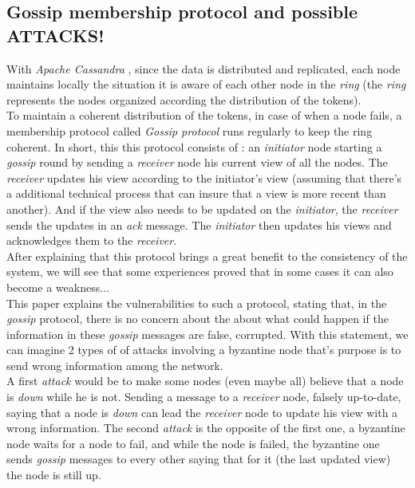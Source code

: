 \documentclass[a4paper]{report}
\newcommand{\ca}{\emph{Apache Cassandra }}
\begin{document}

\subsection{Gossip membership protocol and possible ATTACKS!} %
\label{sub:gossip_membership_protocol_and_potential_weaknesses}

With \ca, since the data is distributed and replicated, each node maintains locally the situation it is aware of each other node in the \emph{ring} (the \emph{ring} represents the nodes organized according the distribution of the tokens). \\
To maintain a coherent distribution of the tokens, in case of when a node fails, a membership protocol called \emph{Gossip protocol} runs regularly to keep the ring coherent. In short, this this protocol consists of : an \emph{initiator} node starting a \emph{gossip} round by sending a \emph{receiver} node his current view of all the nodes. The \emph{receiver} updates his view according to the initiator's view (assuming that there's a additional technical process that can insure that a view is more recent than another). And if the view also needs to be updated on the \emph{initiator}, the \emph{receiver} sends the updates in an \emph{ack} message. The \emph{initiator} then updates his views and acknowledges them to the \emph{receiver}.\\
After explaining that this protocol brings a great benefit to the consistency of the system, we will see that some experiences proved that in some cases it can also become a weakness...\\
This\cite{Aniello13} paper explains the vulnerabilities to such a protocol, stating that, in the \emph{gossip} protocol, there is no concern about the about what could happen if the information in these \emph{gossip} messages are false, corrupted. With this statement, we can imagine 2 types of of attacks involving a byzantine node that's purpose is to send wrong information among the network.\\
A first \emph{attack} would be to make some nodes (even maybe all) believe that a node is \emph{down} while he is not. Sending a message to a \emph{receiver} node, falsely up-to-date, saying that a node is \emph{down} can lead the \emph{receiver} node to update his view with a wrong information. The second \emph{attack} is the opposite of the first one, a byzantine node waits for a node to fail, and while the node is failed, the byzantine one sends \emph{gossip} messages to every other saying that for it (the last updated view) the node is still up.\\
\end{document}
